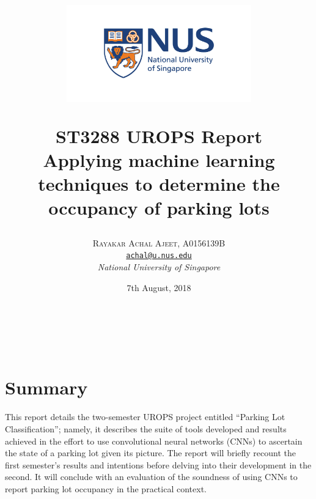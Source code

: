 \documentclass[a4paper, 11pt]{article} %
\title{
	\begin{figure}
		\begin{center}
					\includegraphics[width=8cm]{figures/logo.jpg}
		\end{center}
	\end{figure}	
	\textbf{ST3288 UROPS Report
}\\
Applying machine learning techniques to determine the occupancy of parking lots}
\author{\textsc{Rayakar Achal Ajeet, A0156139B}\\
		\texttt{\hyperlink{achal@u.nus.edu}{achal@u.nus.edu}}\\
		\textit{National University of Singapore}
}
\date{7th August, 2018}
\makeatletter
\renewcommand{\maketitle}{
\begin{flushright}
	{\LARGE\@title}
	\vspace{50pt} \\
	{\large\@author}
	\\\@date
	\vspace{40pt}
\end{flushright}
}
\makeatother
\begin{document}
\maketitle %

\newpage

\tableofcontents

\newpage

\section{Summary}
    This report details the two-semester UROPS project entitled ``Parking Lot
    Classification''; namely, it describes the suite of tools developed and 
    results achieved in the effort to use
    convolutional neural networks (CNNs) to ascertain the state of a parking lot given its picture. The 
    report will briefly recount the first semester's results and intentions 
    before delving into their development in the second. It will conclude with 
    an evaluation of the soundness of using CNNs to report parking lot 
    occupancy in the practical context.
\end{document}
